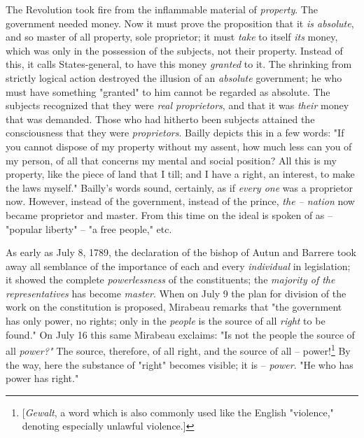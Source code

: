 \documentclass[a4paper]{book}
\begin{document}
The Revolution took fire from the inflammable material of \textit{property}. 
The government needed money. Now it must prove the proposition that it 
\textit{is absolute}, and so master of all property, sole proprietor; it must 
\textit{take} to itself \textit{its} money, which was only in the possession 
of the subjects, not their property. Instead of this, it calls States-general, 
to have this money \textit{granted} to it. The shrinking from strictly logical 
action destroyed the illusion of an \textit{absolute} government; he who must 
have something "{}granted"{} to him cannot be regarded as absolute. The 
subjects recognized that they were \textit{real proprietors}, and that it was 
\textit{their} money that was demanded. Those who had hitherto been subjects 
attained the consciousness that they were \textit{proprietors}. Bailly depicts 
this in a few words: "{}If you cannot dispose of my property without my 
assent, how much less can you of my person, of all that concerns my mental and 
social position? All this is my property, like the piece of land that I till; 
and I have a right, an interest, to make the laws myself."{} Bailly's words 
sound, certainly, as if \textit{every one} was a proprietor now. However, 
instead of the government, instead of the prince, \textit{the -- nation} now 
became proprietor and master. From this time on the ideal is spoken of as -- 
"{}popular liberty"{} -- "{}a free people,"{} etc.

As early as July 8, 1789, the declaration of the bishop of Autun and Barrere 
took away all semblance of the importance of each and every 
\textit{individual} in legislation; it showed the complete 
\textit{powerlessness} of the constituents; the \textit{majority of the 
representatives} has become \textit{master}. When on July 9 the plan for 
division of the work on the constitution is proposed, Mirabeau remarks that 
"{}the government has only power, no rights; only in the \textit{people} is 
the source of all \textit{right} to be found."{} On July 16 this same Mirabeau 
exclaims: "{}Is not the people the source of all \textit{power?"{}} The 
source, therefore, of all right, and the source of all -- 
power!\footnote{[\textit{Gewalt}, a word which is also commonly used like the 
English "{}violence,"{} denoting especially unlawful violence.]} By the way, 
here the substance of "{}right"{} becomes visible; it is -- \textit{power}. 
"{}He who has power has right."{}
\end{document}
